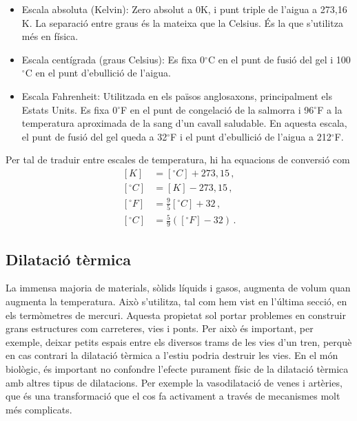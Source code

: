 \documentclass[12pt]{book}
\begin{document}
\begin{itemize}
    \item Escala absoluta (Kelvin): Zero absolut a 0K, i punt triple de l'aigua a 273,16 K. La separació entre graus és la mateixa que la Celsius. És la que s'utilitza més en física. 
    \item Escala centígrada (graus Celsius): Es fixa 0$^\circ$C en el punt de fusió del gel i 100$^\circ$C en el punt d'ebullició de l'aigua. 
    \item Escala Fahrenheit:  Utilitzada en els països anglosaxons, principalment els Estats Units. Es fixa 0$^\circ$F en el punt de congelació de la salmorra i 96$^\circ$F a la temperatura aproximada de la sang d'un cavall saludable. En aquesta escala, el punt de fusió del gel queda a 32$^\circ$F i el punt d'ebullició de l'aigua a 212$^\circ$F.
\end{itemize}

Per tal de traduir entre escales de temperatura, hi ha equacions de conversió com
%
\begin{equation}
\begin{split}
    [K] &= [^\circ C] + 273,15\, , \\
    [^\circ C] &= [K] - 273,15\, , \\
    [^\circ F] &= \frac{9}{5} [^\circ C] + 32\, , \\
    [^\circ C] &= \frac{5}{9} \left([^\circ F] - 32\right)\, .
\end{split}
\end{equation}

\subsection{Dilatació tèrmica}

La immensa majoria de materials, sòlids líquids i gasos, augmenta de volum quan augmenta la temperatura. Això s'utilitza, tal com hem vist en l'última secció, en els termòmetres de mercuri. Aquesta propietat sol portar problemes en construir grans estructures com carreteres, vies i ponts. Per això és important, per exemple, deixar petits espais entre els diversos trams de les vies d'un tren, perquè en cas contrari la dilatació tèrmica a l'estiu podria destruir les vies. En el món biològic, és important no confondre l'efecte purament físic de la dilatació tèrmica amb altres tipus de dilatacions. Per exemple la vasodilatació de venes i artèries, que és una transformació que el cos fa activament a través de mecanismes molt més complicats.
\end{document}
